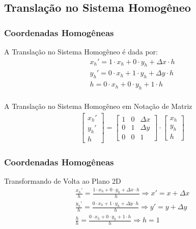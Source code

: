 \documentclass{beamer}
\begin{document}
\subsection{Translação no Sistema Homogêneo}
\begin{frame}
\frametitle{Coordenadas Homogêneas}
	\begin{block}{A Translação no Sistema Homogêneo é dada por:}
		\begin{eqnarray*}
			x_h' = 1 \cdot x_h + 0 \cdot y_h + \Delta x \cdot h \\
			y_h' = 0 \cdot x_h + 1 \cdot y_h + \Delta y \cdot h \\
			h = 0 \cdot x_h + 0 \cdot y_h + 1 \cdot h \\
		\end{eqnarray*}
	\end{block}
	
	\begin{block}{A Translação no Sistema Homogêneo em Notação de Matriz}
		\begin{eqnarray*}
			\begin{bmatrix} 
					x_h' \\
					y_h' \\
					h
			\end{bmatrix}
			=	\begin{bmatrix}
					1	& 0 	& \Delta x \\
					0 	& 1	& \Delta y \\
					0	& 0	& 1
					\end{bmatrix}
			\cdot \begin{bmatrix}
					x_h \\
					y_h \\
					h
				\end{bmatrix}
		\end{eqnarray*}
	\end{block}

\end{frame}


\begin{frame}
\frametitle{Coordenadas Homogêneas}
	\begin{block}{Transformando de Volta ao Plano 2D}
		\begin{eqnarray*}
			\frac{x_h'}{h} = \frac{1 \cdot x_h + 0 \cdot y_h + \Delta x \cdot h}{h} \Rightarrow x' = x + \Delta x  \\
			\frac{y_h'}{h} = \frac{0 \cdot x_h + 1 \cdot y_h + \Delta y \cdot h}{h} \Rightarrow y' = y + \Delta y  \\
			\frac{h}{h} = \frac{0 \cdot x_h + 0 \cdot y_h + 1 \cdot h}{h} \Rightarrow h = 1  \\\\
		\end{eqnarray*}
	\end{block}


\end{frame}
\end{document}
